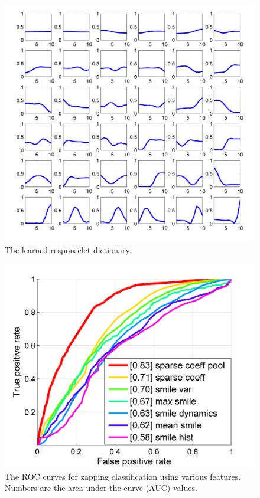 \documentclass[10pt,journal,cspaper,compsoc]{IEEEtran}
\begin{document}
\begin{figure}[h]
	\centering
		\includegraphics[width=1\columnwidth]{fig/dict.png}
	\caption{The learned responselet dictionary.}
	\label{fig:dict}
\end{figure}

\begin{figure}[h]
	\centering
		\includegraphics[width=.85\columnwidth]{fig/cls_performance.png}
	\caption{The ROC curves for zapping classification using various features. Numbers are the area under the curve (AUC) values.}
	\label{fig:cls_performance}
\end{figure}
\end{document}
